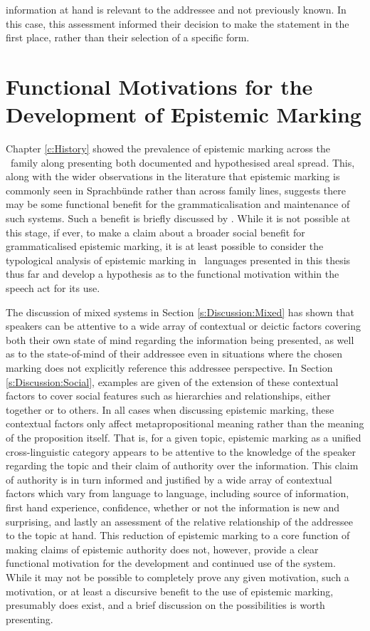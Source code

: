 information at hand is relevant to the addressee and not previously known. In this case, this assessment informed their decision to make the statement in the first place, rather than their selection of a specific form.

\section{Functional Motivations for the Development of Epistemic Marking}\label{s:Discussion:Motivations}
Chapter \ref{c:History} showed the prevalence of epistemic marking across the \lfam\ family along presenting both documented and hypothesised areal spread. This, along with the wider observations in the literature that epistemic marking is commonly seen in Sprachbünde rather than across family lines, suggests there may be some functional benefit for the grammaticalisation and maintenance of such systems. Such a benefit is briefly discussed by . While it is not possible at this stage, if ever, to make a claim about a broader social benefit for grammaticalised epistemic marking, it is at least possible to consider the typological analysis of epistemic marking in \lfam\ languages presented in this thesis thus far and develop a hypothesis as to the functional motivation within the speech act for its use.

The discussion of mixed systems in Section \ref{s:Discussion:Mixed} has shown that speakers can be attentive to a wide array of contextual or deictic factors covering both their own state of mind regarding the information being presented, as well as to the state-of-mind of their addressee even in situations where the chosen marking does not explicitly reference this addressee perspective. In Section \ref{s:Discussion:Social}, examples are given of the extension of these contextual factors to cover social features such as hierarchies and relationships, either together or to others. In all cases when discussing epistemic marking, these contextual factors only affect metapropositional meaning rather than the meaning of the proposition itself. That is, for a given topic, epistemic marking as a unified cross-linguistic category appears to be attentive to the knowledge of the speaker regarding the topic and their claim of authority over the information. This claim of authority is in turn informed and justified by a wide array of contextual factors which vary from language to language, including source of information, first hand experience, confidence, whether or not the information is new and surprising, and lastly an assessment of the relative relationship of the addressee to the topic at hand. This reduction of epistemic marking to a core function of making claims of epistemic authority does not, however, provide a clear functional motivation for the development and continued use of the system. While it may not be possible to completely prove any given motivation, such a motivation, or at least a discursive benefit to the use of epistemic marking, presumably does exist, and a brief discussion on the possibilities is worth presenting. 


